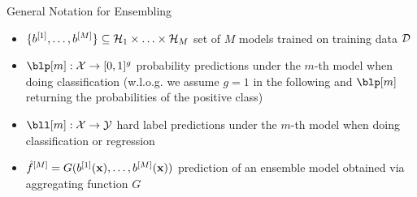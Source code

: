\documentclass[10pt,compress,t,notes=noshow, xcolor=table]{beamer}
\begin{document}

\begin{vbframe}{General Notation for Ensembling}
\vfill
\begin{itemize}
    \item $\{b^{[1]}, \ldots, b^{[M]}\} \subseteq \mathcal{H}_{1} \times \ldots \times \mathcal{H}_{M}$ set of $M$ models trained on training data $\mathcal{D}$
    \item $\blp[m]: \Xspace \rightarrow [0, 1]^{g}$ probability predictions under the $m$-th model when doing classification (w.l.o.g. we assume $g = 1$ in the following and $\blp[m]$ returning the probabilities of the positive class)
    \item $\bll[m]: \Xspace \rightarrow \Yspace$ hard label predictions under the $m$-th model when doing classification or regression
    \item $\hat{f}^{[M]} = G(b^{[1]}(\mathbf{x}), \ldots, b^{[M]}(\mathbf{x}))$ prediction of an ensemble model obtained via aggregating function $G$
\end{itemize}
\vfill
\end{vbframe}
\end{document}
